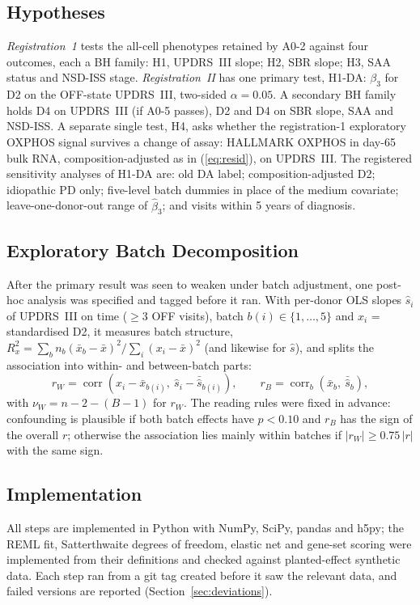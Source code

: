 \subsection{Hypotheses}\label{sec:hypotheses}
\emph{Registration~1} tests the all-cell phenotypes retained by A0-2 against four outcomes, each a
BH family: H1, UPDRS~III slope; H2, SBR slope; H3, SAA status and NSD-ISS stage.
\emph{Registration~II} has one primary test, H1-DA: $\beta_3$ for D2 on the OFF-state UPDRS~III,
two-sided $\alpha = 0.05$. A secondary BH family holds D4 on UPDRS~III (if A0-5 passes), D2 and D4 on
SBR slope, SAA and NSD-ISS. A separate single test, H4, asks whether the registration-1 exploratory
OXPHOS signal survives a change of assay: HALLMARK OXPHOS in day-65 bulk RNA, composition-adjusted
as in (\ref{eq:resid}), on UPDRS~III. The registered sensitivity analyses of H1-DA are: old DA label;
composition-adjusted D2; idiopathic PD only; five-level batch dummies in place of the medium
covariate; leave-one-donor-out range of $\hat\beta_3$; and visits within 5 years of diagnosis.

\subsection{Exploratory Batch Decomposition}\label{sec:batchmethod}
After the primary result was seen to weaken under batch adjustment, one post-hoc analysis was
specified and tagged before it ran. With per-donor OLS slopes $\hat s_i$ of UPDRS~III on time
($\ge 3$ OFF visits), batch $b(i) \in \{1,\dots,5\}$ and $x_i$ = standardised D2, it measures
batch structure, $R^2_x = \sum_b n_b(\bar x_b - \bar x)^2 / \sum_i (x_i - \bar x)^2$ (and likewise
for $\hat s$), and splits the association into within- and between-batch parts:
\begin{equation}
r_{W} = \operatorname{corr}\!\left(x_i - \bar x_{b(i)},\ \hat s_i - \bar{\hat s}_{b(i)}\right),
\qquad
r_{B} = \operatorname{corr}_b\!\left(\bar x_b,\ \bar{\hat s}_b\right),
\label{eq:within}
\end{equation}
with $\nu_W = n - 2 - (B - 1)$ for $r_W$. The reading rules were fixed in advance: confounding is
plausible if both batch effects have $p < 0.10$ and $r_B$ has the sign of the overall $r$;
otherwise the association lies mainly within batches if $|r_W| \ge 0.75\,|r|$ with the same sign.

\subsection{Implementation}\label{sec:impl}
All steps are implemented in Python with NumPy, SciPy, pandas and h5py; the REML fit,
Satterthwaite degrees of freedom, elastic net and gene-set scoring were implemented from their
definitions and checked against planted-effect synthetic data. Each step ran from a git tag
created before it saw the relevant data, and failed versions are reported (Section~\ref{sec:deviations}).
